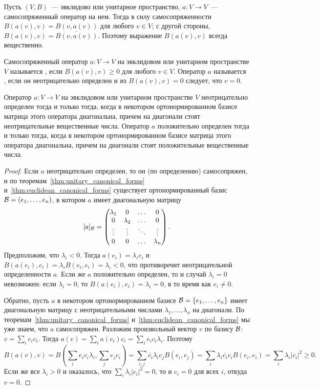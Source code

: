 Пусть $(V,B)$~--- эвклидово или унитарное пространство, $a\colon V\to
V$~--- самосопряженный оператор на нем.
Тогда в силу самосопряженности $B(a(v),v) = B(v,a(v))$ для любого $v\in
V$; с другой стороны, $B(a(v),v) = \overline{B(v,a(v))}$. Поэтому
выражение $B(a(v),v)$ всегда вещественно.

\begin{definition}
Самосопряженный оператор $a\colon V\to V$ на эвклидовом или унитарном
пространстве $V$ называется , если
$B(a(v),v)\geq 0$ для любого $v\in V$. Оператор $a$ называется
, если он
неотрицательно определен и из
$B(a(v),v)=0$ следует, что $v=0$.
\end{definition}

\begin{proposition}\label{prop:positive_definition}
Оператор $a\colon V\to V$ на эвклидовом или унитарном пространстве $V$
неотрицательно определен тогда и только тогда, когда в некотором
ортонормированном базисе матрица этого оператора диагональна, причем
на диагонали стоят неотрицательные вещественные числа.
Оператор $a$ положительно определен тогда и только тогда, когда в
некотором ортонормированном базисе матрица этого оператора
диагональна, причем на диагонали стоят положительные вещественные числа.
\end{proposition}
\begin{proof}
Если $a$ неотрицательно определен, то он (по определению)
самосопряжен, и по теоремам~\ref{thm:unitary_canonical_forms}
и~\ref{thm:euclidean_canonical_forms} существует ортонормированный
базис $\mathcal B = (e_1,\dots,e_n)$, в котором $a$ имеет
диагональную матрицу
$$
[a]_{\mathcal B} = \begin{pmatrix}\lambda_1 & 0 & \dots & 0 \\ 0 & \lambda_2 &
  \dots & 0\\ \vdots & \vdots & \ddots & \vdots \\ 0 & 0 & \dots &
  \lambda_n\end{pmatrix}.
$$
Предположим, что $\lambda_i<0$. Тогда $a(e_i) = \lambda_ie_i$ и
$B(a(e_i),e_i) = \lambda_i B(e_i,e_i) = \lambda_i < 0$, что
противоречит неотрицательной определенности $a$. Если же $a$
положительно определен, то и случай $\lambda_i=0$ невозможен: если
$\lambda_i=0$, то $B(a(e_i),e_i) = \lambda_i = 0$, в то время как
$e_i\neq 0$.

Обратно, пусть $a$ в некотором ортонормированном базисе $\mathcal
B=\{e_1,\dots,e_n\}$ имеет
диагональную матрицу с неотрицательными числами
$\lambda_1,\dots,\lambda_n$ на диагонали. По
теоремам~\ref{thm:unitary_canonical_forms}
и~\ref{thm:euclidean_canonical_forms} мы уже знаем, что $a$
самосопряжен. Разложим произвольный вектор $v$ по базису $\mathcal B$:
$v = \sum_i e_i c_i$.
Тогда $a(v) = \sum_i a(e_i) c_i = \sum_i e_i c_i\lambda_i$.
Поэтому
$$
B(a(v),v) = B(\sum_i e_i c_i\lambda_i,\sum_j e_j c_i)
= \sum_{i,j}\overline{c_i}\lambda_i c_j B(e_i,e_j)
= \sum_i\lambda_i \overline{c_i}c_i B(e_i,e_i)
= \sum_i\lambda_i |c_i|^2 \geq 0.
$$
Если же все $\lambda_i>0$ и оказалось, что $\sum_i\lambda_i
|c_i|^2=0$, то и $c_i=0$ для всех $i$, откуда $v=0$.
\end{proof}

